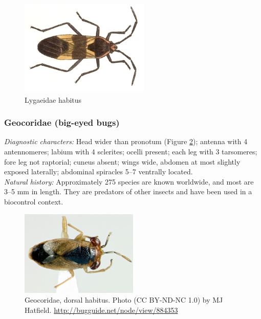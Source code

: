 \documentclass[letterpaper, 11pt]{article}
\begin{document}
\begin{figure}[ht!]
 \centering
 \includegraphics[width=0.55\textwidth]{LygaeidHabitus}
 \caption{Lygaeidae habitus \citep[][Plate 16, Fig. 23]{bhl14630}}
 \label{fig:lygaeid1}
\end{figure}

\subsubsection{Geocoridae (big-eyed bugs)}
\noindent{}\textit{Diagnostic characters:} Head wider than pronotum (Figure \ref{fig:geocorid1}); antenna with 4 antennomeres; labium with 4 sclerites; ocelli present; each leg with 3 tarsomeres; fore leg not raptorial; cuneus absent; wings wide, abdomen at most slightly exposed laterally; abdominal spiracles 5--7 ventrally located.\\

\noindent{}\textit{Natural history:} Approximately 275 species are known worldwide, and most are 3--5 mm in length. They are predators of other insects and have been used in a biocontrol context. \\

\begin{figure}[ht!]
 \centering
 \includegraphics[width=0.5\textwidth]{GeocoridHabitus}
 \caption{Geocoridae, dorsal habitus. Photo (CC BY-ND-NC 1.0) by MJ Hatfield. \url{http://bugguide.net/node/view/884353}}
 \label{fig:geocorid1}
\end{figure}
\end{document}
